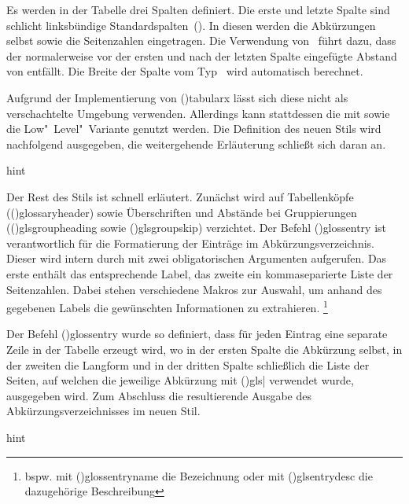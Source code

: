\documentclass[%
  english,ngerman,%
  cdgeometry=no,DIV=12,%
  cd=false,cdfont=false,cdtitle=true,%
  headings=normal,%
  automark,%
  listof=toc,%
]{tudscrartcl}
\begin{document}
Es werden in der Tabelle drei Spalten definiert. Die erste und letzte Spalte 
sind schlicht linksbündige Standardspalten~(). In diesen werden die 
Abkürzungen selbst sowie die Seitenzahlen eingetragen. Die Verwendung 
von~ führt dazu, dass der normalerweise vor der ersten 
und nach der letzten Spalte eingefügte Abstand von  entfällt. 
Die Breite der Spalte vom Typ~ wird automatisch berechnet.

Aufgrund der Implementierung von \Environment(){tabularx} 
lässt sich diese nicht als verschachtelte Umgebung verwenden. Allerdings kann 
stattdessen die mit  sowie  die 
Low"~Level"~Variante genutzt werden. Die Definition des neuen Stils 
 wird nachfolgend ausgegeben, die weitergehende 
Erläuterung schließt sich daran an.
%
\CodeHook{\let\newglossarystyle\renewglossarystyle}
\begin{Code}[input]{hint}

\end{Code}

Der Rest des Stils ist schnell erläutert. Zunächst wird auf Tabellenköpfe 
(\Macro(){glossaryheader}) sowie Überschriften und Abstände 
bei Gruppierungen (\Macro(){glsgroupheading} sowie 
\Macro(){glsgroupskip}) verzichtet. Der Befehl 
\Macro(){glossentry} ist verantwortlich für die 
Formatierung der Einträge im Abkürzungsverzeichnis. Dieser wird intern durch 
 mit zwei obligatorischen Argumenten aufgerufen. Das erste 
enthält das entsprechende Label, das zweite ein kommaseparierte Liste der 
Seitenzahlen. Dabei stehen verschiedene Makros zur Auswahl, um anhand des 
gegebenen Labels die gewünschten Informationen zu extrahieren.%
\footnote{%
  bspw. mit \Macro(){glossentryname} die Bezeichnung oder 
  mit \Macro(){glsentrydesc} die dazugehörige Beschreibung%
}

Der Befehl \Macro(){glossentry} wurde so definiert, dass 
für jeden Eintrag eine separate Zeile in der Tabelle erzeugt wird, wo in der 
ersten Spalte die Abkürzung selbst, in der zweiten die Langform und in der 
dritten Spalte schließlich die Liste der Seiten, auf welchen die jeweilige 
Abkürzung mit \Macro(){gls|} verwendet 
wurde, ausgegeben wird. Zum Abschluss die resultierende Ausgabe des 
Abkürzungsverzeichnisses im neuen Stil.
%
\begin{Code}[input]{hint}
\printacronyms[style=acrotabularx]
\end{Code}
\end{document}
